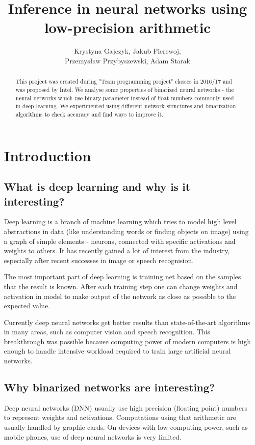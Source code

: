 \documentclass[licencjacka]{pracamgr}
\title{Inference in neural networks using low-precision arithmetic}
\author{Krystyna Gajczyk, Jakub Pierewoj,\\ Przemysław Przybyszewski, Adam Starak}
\begin{document}
\maketitle
\begin{abstract}
This project was created during "Team programming project" classes in 2016/17 and was proposed by Intel. We analyse some properties of binarized neural networks - the neural networks which use binary parameter instead of float numbers commonly used in deep learning. We experimented using different network structures and binarization algorithms to check accuracy and find ways to improve it.
\end{abstract}

\tableofcontents

\chapter{Introduction}
	
\section{What is deep learning and why is it interesting?}

Deep learning is a branch of machine learning which tries to model high level abstractions in data (like understanding words or finding objects on image) using a graph of simple elements - neurons, connected with specific activations and weights to others. It has recently gained a lot of interest from the industry, especially after recent successes in image or speech recognision.

The most important part of deep learning is training net based on the samples that the result is known. After each training step one can change weights and activation in model to make output of the network as close as possible to the expected value.


Currently deep neural networks get better results than state-of-the-art algorithms in many areas, such as computer vision and speech recognition. This breakthrough was possible because computing power of modern computers is high enough to handle intensive workload required to train large artificial neural networks.

\section{Why binarized networks are interesting?}
	Deep neural networks (DNN) usually use high precision (floating point) numbers to represent
	weights and activations. Computations using that arithmetic are usually handled by
	graphic cards. On devices with low computing power, such as mobile phones, use of deep neural networks is very limited.
	
\end{document}
